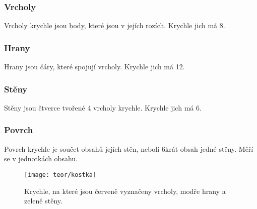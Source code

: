 \subsubsection{Vrcholy}
Vrcholy krychle jsou body, které jsou v jejích rozích. Krychle jich má 8.

\subsubsection{Hrany}
Hrany jsou čáry, které spojují vrcholy. Krychle jich má 12.

\subsubsection{Stěny}
Stěny jsou čtverce tvořené 4 vrcholy krychle. Krychle jich má 6.

\subsubsection{Povrch}
Povrch krychle je součet obsahů jejích stěn, neboli 6krát obsah jedné stěny. Měří se v jednotkách obsahu.

\begin{figure}[h]
    \caption{Krychle, na které jsou červeně vyznačeny vrcholy, modře hrany a zeleně stěny.}
    \centering
    \texttt{[image: teor/kostka]}
\end{figure}



